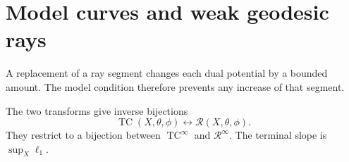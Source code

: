 \section{Model curves and weak geodesic rays}
\label{sec:model-test-curve-ray-correspondence}
A replacement of a ray segment changes each dual potential by a bounded amount. The model condition therefore prevents any increase of that segment.

\begin{theorem}\label{thm:model-test-curve-geodesic-ray-correspondence}
The two transforms give inverse bijections
\[
 \operatorname{TC}(X,\theta,\phi)
                  \longleftrightarrow\mathcal R(X,\theta,\phi).
\]
They restrict to a bijection between $\operatorname{TC}^\infty$ and $\mathcal R^\infty$. The terminal slope is $\sup_X\ell_1$.
\end{theorem}
